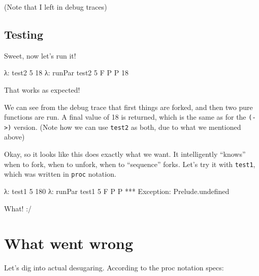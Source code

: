 \documentclass[]{article}
\newenvironment{Shaded}{}{}
\newcommand{\DataTypeTok}[1]{\textcolor[rgb]{0.56,0.13,0.00}{#1}}
\newcommand{\DecValTok}[1]{\textcolor[rgb]{0.25,0.63,0.44}{#1}}
\newcommand{\NormalTok}[1]{#1}
\newcommand{\OperatorTok}[1]{\textcolor[rgb]{0.40,0.40,0.40}{#1}}
\begin{document}
(Note that I left in debug traces)

\subsection{Testing}\label{testing}

Sweet, now let's run it!

\begin{Shaded}
\begin{Highlighting}[]
\NormalTok{λ}\OperatorTok{:}\NormalTok{ test2 }\DecValTok{5}
\DecValTok{18}
\NormalTok{λ}\OperatorTok{:}\NormalTok{ runPar test2 }\DecValTok{5}
\DataTypeTok{F}
\DataTypeTok{P}
\DataTypeTok{P}
\DecValTok{18}
\end{Highlighting}
\end{Shaded}

That works as expected!

We can see from the debug trace that first things are forked, and then two pure
functions are run. A final value of 18 is returned, which is the same as for the
\texttt{(-\textgreater{})} version. (Note how we can use \texttt{test2} as both,
due to what we mentioned above)

Okay, so it looks like this does exactly what we want. It intelligently
``knows'' when to fork, when to unfork, when to ``sequence'' forks. Let's try it
with \texttt{test1}, which was written in \texttt{proc} notation.

\begin{Shaded}
\begin{Highlighting}[]
\NormalTok{λ}\OperatorTok{:}\NormalTok{ test1 }\DecValTok{5}
\DecValTok{180}
\NormalTok{λ}\OperatorTok{:}\NormalTok{ runPar test1 }\DecValTok{5}
\DataTypeTok{F}
\DataTypeTok{P}
\DataTypeTok{P}
\OperatorTok{***} \DataTypeTok{Exception}\OperatorTok{:}\NormalTok{ Prelude.undefined}
\end{Highlighting}
\end{Shaded}

What! :/

\section{What went wrong}\label{what-went-wrong}

Let's dig into actual desugaring. According to the proc notation specs:
\end{document}

